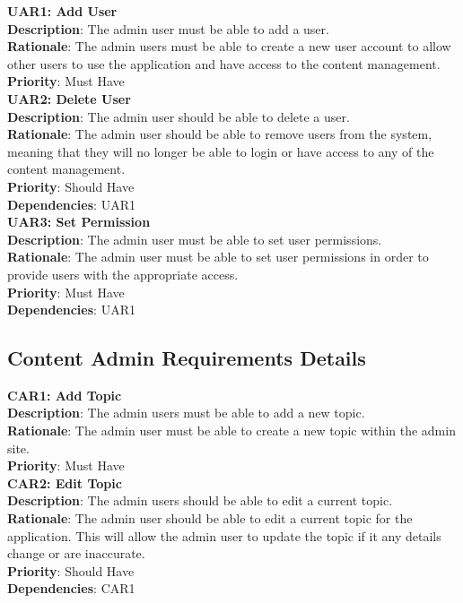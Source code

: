 \documentclass{l3proj}
\begin{document}
\textbf{UAR1: Add User} \\
\textbf{Description}: The admin user must be able to add a user.  \\
\textbf{Rationale}: The admin users must be able to create a new user account to allow other users to use the application and have access to the content management.\\
\textbf{Priority}: Must Have \\

\textbf{UAR2: Delete User} \\
\textbf{Description}: The admin user should be able to delete a user. \\ 
\textbf{Rationale}: The admin user should be able to remove users from the system, meaning that they will no longer be able to login or have access to any of the content management.\\
\textbf{Priority}: Should Have \\
\textbf{Dependencies}: UAR1\\

\textbf{UAR3: Set Permission} \\
\textbf{Description}: The admin user must be able to set user permissions.\\
\textbf{Rationale}: The admin user must be able to set user permissions in order to provide users with the appropriate access.\\
\textbf{Priority}: Must Have \\
\textbf{Dependencies}: UAR1\\

\subsection{Content Admin Requirements Details}

\textbf{CAR1: Add Topic}\\
\textbf{Description}:  The admin users must be able to add a new topic. \\
\textbf{Rationale}: The admin user must be able to create a new topic within the admin site. \\
\textbf{Priority}: Must Have\\


\textbf{CAR2: Edit Topic}\\
\textbf{Description}: The admin users should be able to edit a current topic.\\
\textbf{Rationale}: The admin user should be able to edit a current topic for the application. This will allow the admin user to update the topic if it any details change or are inaccurate.\\
\textbf{Priority}: Should Have \\
\textbf{Dependencies}: CAR1\\
\end{document}
